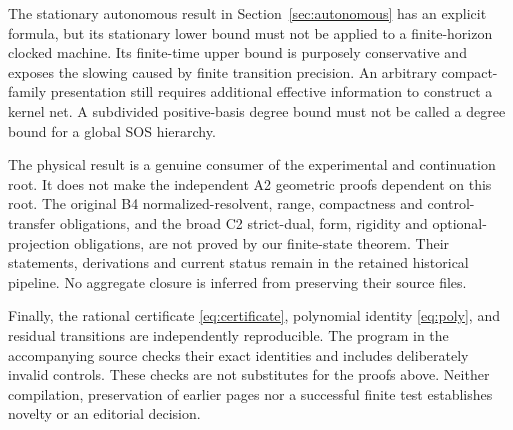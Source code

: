 \documentclass[11pt]{amsart}
\theoremstyle{definition}\newtheorem{definition}[theorem]{Definition}
\theoremstyle{remark}\newtheorem{remark}[theorem]{Remark}
\newcommand{\1}{\mathbf 1}
\begin{document}
The stationary autonomous result in Section~\ref{sec:autonomous} has an
explicit formula, but its stationary lower bound must not be applied to
a finite-horizon clocked machine. Its finite-time upper bound is purposely
conservative and exposes the slowing caused by finite transition
precision. An arbitrary compact-family presentation still requires
additional effective information to construct a kernel net. A subdivided
positive-basis degree bound must not be called a degree bound for a
global SOS hierarchy.

The physical result is a genuine consumer of the experimental and
continuation root. It does not make the independent A2 geometric proofs
dependent on this root. The original B4 normalized-resolvent, range,
compactness and control-transfer obligations, and the broad C2
strict-dual, form, rigidity and optional-projection obligations, are not
proved by our finite-state theorem. Their statements, derivations and
current status remain in the retained historical pipeline. No aggregate
closure is inferred from preserving their source files.

Finally, the rational certificate \eqref{eq:certificate}, polynomial
identity \eqref{eq:poly}, and residual transitions are independently
reproducible. The program in the accompanying source checks their exact
identities and includes deliberately invalid controls. These checks are
not substitutes for the proofs above. Neither compilation, preservation
of earlier pages nor a successful finite test establishes novelty or an
editorial decision.
\end{document}

